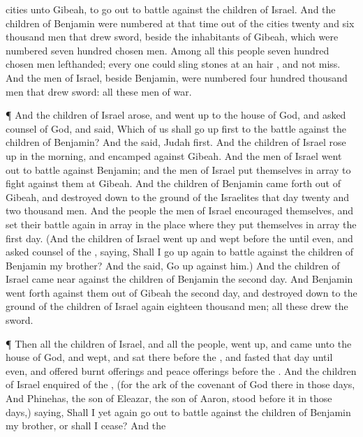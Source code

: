 {cities unto
Gibeah, to go
out to
battle against the
children of
Israel.
And the
children of
Benjamin were
numbered at that
time out of the
cities
twenty and
six
thousand
men that
drew
sword, beside the
inhabitants of
Gibeah, which were
numbered
seven
hundred
chosen
men.
Among all this
people
{}
seven
hundred
chosen
men
lefthanded; every one could
sling
stones at an
hair
{}, and not
miss.
And the
men of
Israel, beside
Benjamin, were
numbered
four
hundred
thousand
men that
drew
sword: all these
{}
men of
war.
\par }{\PP {}¶ And the
children of
Israel
arose, and went
up to the
house of
God, and
asked counsel of
God, and
said,
Which of us shall go
up
first to the
battle against the
children of
Benjamin? And the
{}
said,
Judah
{}
first.
And the
children of
Israel rose
up in the
morning, and
encamped against
Gibeah.
And the
men of
Israel went
out to
battle against
Benjamin; and the
men of
Israel put themselves in
array to
fight against them at
Gibeah.
And the
children of
Benjamin came
forth out of
Gibeah, and destroyed
down to the
ground of the
Israelites that
day
twenty and
two
thousand
men.
And the
people the
men of
Israel
encouraged themselves, and set their
battle
again in
array in the
place where they put themselves in
array the
first
day.
(And the
children of
Israel went
up and
wept
before the
{} until
even, and
asked counsel of the
{},
saying, Shall I go
up
again to
battle against the
children of
Benjamin my
brother? And the
{}
said, Go
up against him.)
And the
children of
Israel came
near against the
children of
Benjamin the
second
day.
And
Benjamin went
forth
against them out of
Gibeah the
second
day, and destroyed
down to the
ground of the
children of
Israel again
eighteen
thousand
men; all these
drew the
sword.
\par }{\PP {}¶ Then all the
children of
Israel, and all the
people, went
up, and
came unto the
house of
God, and
wept, and
sat there
before the
{}, and
fasted that
day until
even, and
offered burnt
offerings and peace
offerings
before the
{}.
And the
children of
Israel
enquired of the
{}, (for the
ark of the
covenant of
God
{} there in those
days,
And
Phinehas, the
son of
Eleazar, the
son of
Aaron,
stood
before it in those
days,)
saying, Shall I yet
again go
out to
battle against the
children of
Benjamin my
brother, or shall I
cease? And the
}

